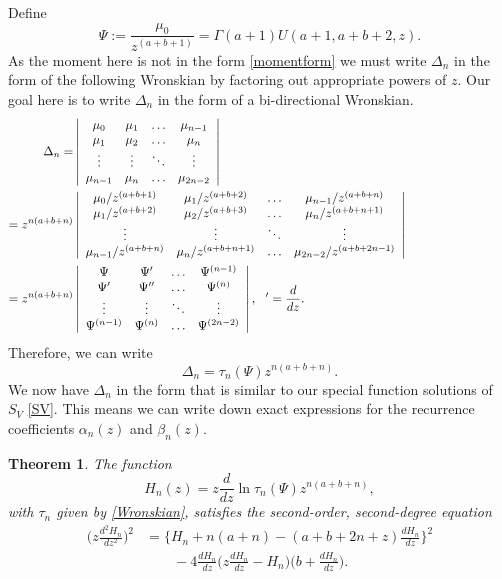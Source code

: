 \documentclass[12pt]{article}
\newtheorem{mydef}{Theorem}[section]
\numberwithin{figure}{section}
\numberwithin{equation}{section}
\numberwithin{table}{section}
\begin{document}
Define
\begin{equation}\nonumber
\Psi:=\frac{\mu_0}{z^{( a+ b+1)}}=\Gamma( a+1) U( a+1, a+ b+2,z).
\end{equation}
As the moment here is not in the form \eqref{momentform} we must write $\Delta_n$ in the form of the following Wronskian by factoring out appropriate powers of $z$. Our goal here is to write $\Delta_n$ in the form of a bi-directional Wronskian.
\begin{align*}
\Delta_n=&\left|
\begin{array}{cccc}
\mu_{0} & \mu_{1}  &\hdots& \mu_{n-1} \\
\mu_{1} &\mu_{2}  &\hdots& \mu_{n}  \\
\vdots &\vdots  & \ddots &\vdots \\
\mu_{n-1} &\mu_{n}  &\hdots& \mu_{2n-2}
\end{array}
\right|\hspace{30mm}\\
=z^{n(a+b+n)}&\left|
\begin{array}{cccc}
\mu_{0}/z^{( a+ b+1)} & \mu_{1}/z^{( a+ b+2)}  &\hdots& \mu_{n-1}/z^{( a+ b+n)} \\
\mu_{1}/z^{( a+ b+2)} &\mu_{2}/z^{( a+ b+3)}  &\hdots& \mu_{n}/z^{( a+ b+n+1)}  \\
\vdots &\vdots  & \ddots &\vdots \\
\mu_{n-1}/z^{( a+ b+n)} &\mu_{n}/z^{( a+ b+n+1)}  &\hdots& \mu_{2n-2}/z^{( a+ b+2n-1)}
\end{array}
\right|\hspace{30mm}\\
=z^{n( a+ b+n)}&\left|
\begin{array}{cccc}
\Psi & \Psi'  &\hdots& \Psi^{(n-1)} \\
\Psi' & \Psi''  &\hdots& \Psi^{(n)}  \\
\vdots &\vdots  & \ddots &\vdots \\
\Psi^{(n-1)} & \Psi^{(n)}  &\hdots& \Psi^{(2n-2)}
\end{array}\right|,~~'=\frac{d}{dz}.\\
\end{align*}
Therefore, we can write
\begin{equation}
\Delta_n=\tau_n(\Psi)z^{n( a+ b+n)}.\label{taudelta5a}
\end{equation}
We now have $\Delta_n$ in the form that is similar to our special function solutions of $S_{V}$ \eqref{SV}. This means we can write down exact expressions for the recurrence coefficients $\alpha_n(z)$ and $\beta_n(z)$.
\begin{mydef}
The function
\begin{equation}
H_n(z)=z\frac{d}{dz}\ln\tau_n(\Psi)z^{n( a+ b+n)},\label{Hn3}
\end{equation}
with $\tau_n$ given by \eqref{Wronskian}, satisfies the second-order, second-degree equation
\begin{align}\nonumber
\bigg({z}\frac{d^2H_{{n}}}{dz^2}\bigg)^{2}&=\bigg\{H_n+n(a+n)-(a+b+2n+z)\frac{dH_n}{dz}\bigg\}^2\\
&\qquad-4\frac{dH_n}{dz}
\bigg(z\frac{dH_n}{dz}-H_n\bigg)\bigg(b+\frac{dH_n}{dz}\bigg).\label{Hn2}
\end{align}
\end{mydef}
\end{document}
